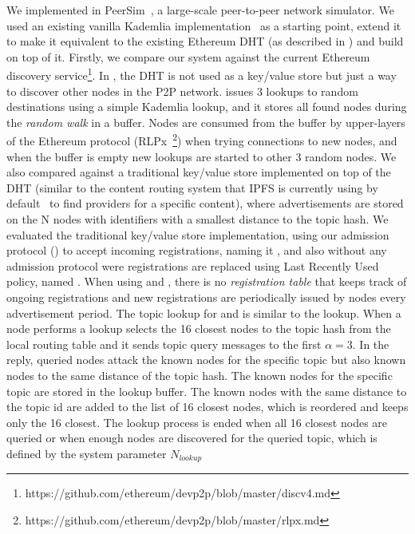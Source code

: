  We implemented \sysname in PeerSim~\cite{p2p09-peersim}, a large-scale peer-to-peer network simulator. 
We used an existing vanilla Kademlia implementation~\cite{peersim_kademlia} as a starting point, extend it to make it equivalent to the existing Ethereum DHT (as described in ) and build \sysname on top of it. 
Firstly,  we compare our system against the current Ethereum \discv discovery service\footnote{https://github.com/ethereum/devp2p/blob/master/discv4.md}.
In \discv, the DHT is not used as a key/value store but just a way to discover other nodes in the P2P network. 
\discv issues 3 lookups to random destinations using a simple Kademlia lookup,  and it stores all found nodes during the  \emph{random walk} in a buffer. 
Nodes are consumed from the buffer by upper-layers of the Ethereum protocol (RLPx~\footnote{https://github.com/ethereum/devp2p/blob/master/rlpx.md})
when trying connections to new nodes, and when the buffer is empty new lookups are started to other 3 random nodes.
We also compared \sysname against  a traditional key/value store implemented on top of the DHT (similar to the content routing system that IPFS is currently using by default~\cite{libp2p_kaddht} to find providers for a specific content),  where advertisements are stored on the N nodes with identifiers with a smallest distance  to the topic hash.  
We evaluated the traditional key/value store implementation, using our admission protocol () to accept incoming registrations,  naming it \altnameticket, and also without any admission protocol were registrations are replaced using  Last Recently Used policy, named \altname.
When using \altname and \altnameticket, there is no \emph{registration table} that keeps track of ongoing registrations and new registrations are periodically issued by nodes every advertisement period.
The topic lookup for \altname and \altnameticket is similar to the \discv lookup.  When a node performs a lookup selects the 16 closest nodes to the topic hash from the local routing table and it sends topic query messages to the first  $\alpha=3$.
In the reply, queried nodes attack the known nodes for the specific topic but also known nodes to the same distance of the topic hash. 
The known nodes for the specific topic are stored in the lookup buffer. 
The known nodes with the same distance to the topic id are added to the list of 16 closest nodes,  which is reordered and keeps only the 16 closest.
The lookup process is ended when all 16 closest nodes are queried or when enough nodes are discovered for the queried topic, which is defined by the system parameter $N_\textit{lookup}$ 


